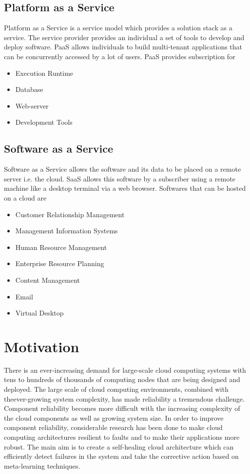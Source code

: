 \subsection{Platform as a Service}
Platform as a Service is a service model which provides a solution stack as a service. The service provider provides an individual a set of tools to develop and deploy software. PaaS allows individuals to build multi-tenant applications that can be concurrently accessed by a lot of users. PaaS provides subscription for
	\begin{itemize}
		\item Execution Runtime
		\item Database
		\item Web-server
		\item Development Tools
	\end{itemize}
\subsection{Software as a Service}
Software as a Service allows the software and its data to be placed on a remote server i.e. the cloud. SaaS allows this software by a subscriber using a remote machine like a desktop terminal via a web browser. Softwares that can be hosted on a cloud are
	\begin{itemize}
		\item Customer Relationship Management
		\item Management Information Systems
		\item Human Resource Management
		\item Enterprise Resource Planning
		\item Content Management
		\item Email
		\item Virtual Desktop
	\end{itemize}

\section{Motivation}
There is an ever-increasing demand for large-scale cloud computing systems with tens to hundreds of thousands of computing nodes that are being designed and deployed. The large scale of cloud computing environments, combined with theever-growing system complexity, has made reliability a tremendous challenge. Component reliability becomes more difficult with the increasing complexity of the cloud components as well as growing system size.\cite{FAILURE_3} In order to improve component reliability, considerable research has been done to make cloud computing architectures resilient to faults and to make their applications more robust. The main aim is to create a self-healing cloud architecture which can efficiently detect failures in the system and take the corrective action based on meta-learning techniques.

